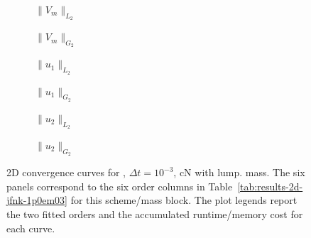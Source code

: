 \begin{figure}[p]
\centering
\begin{subfigure}{0.485\linewidth}
\centering
{}
\caption{$\|V_m\|_{L_2}$}
\label{fig:results-2d-jfnk-1p0em03-cranknicolson-lumped-a}
\end{subfigure}
\hfill
\begin{subfigure}{0.485\linewidth}
\centering
{}
\caption{$\|V_m\|_{G_2}$}
\label{fig:results-2d-jfnk-1p0em03-cranknicolson-lumped-b}
\end{subfigure}
\par\vspace{0.8em}
\begin{subfigure}{0.485\linewidth}
\centering
{}
\caption{$\|u_1\|_{L_2}$}
\label{fig:results-2d-jfnk-1p0em03-cranknicolson-lumped-c}
\end{subfigure}
\hfill
\begin{subfigure}{0.485\linewidth}
\centering
{}
\caption{$\|u_1\|_{G_2}$}
\label{fig:results-2d-jfnk-1p0em03-cranknicolson-lumped-d}
\end{subfigure}
\par\vspace{0.8em}
\begin{subfigure}{0.485\linewidth}
\centering
{}
\caption{$\|u_2\|_{L_2}$}
\label{fig:results-2d-jfnk-1p0em03-cranknicolson-lumped-e}
\end{subfigure}
\hfill
\begin{subfigure}{0.485\linewidth}
\centering
{}
\caption{$\|u_2\|_{G_2}$}
\label{fig:results-2d-jfnk-1p0em03-cranknicolson-lumped-f}
\end{subfigure}
\caption{2D convergence curves for , $\Delta t=10^{-3}$, cN with lump. mass. The six panels correspond to the six order columns in Table~\ref{tab:results-2d-jfnk-1p0em03} for this scheme/mass block. The plot legends report the two fitted orders and the accumulated runtime/memory cost for each curve.}
\label{fig:results-2d-jfnk-1p0em03-cranknicolson-lumped}
\end{figure}
\FloatBarrier

